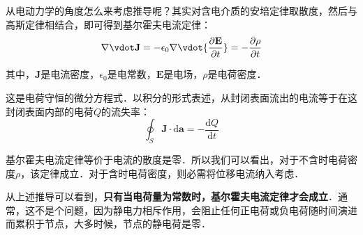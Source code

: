从电动力学的角度怎么来考虑推导呢？其实对含电介质的安培定律取散度，然后与高斯定律相结合，即可得到基尔霍夫电流定律：
\begin{equation}
\nabla \vdot \mathbf {J} =-\epsilon _{0}\nabla \vdot {\frac {\partial \mathbf {E} }{\partial t}}=-{\frac {\partial \rho }{\partial t}}
\end{equation}
 
其中，$\mathbf{J}$是电流密度，$\epsilon_0$是电常数，$\mathbf{E}$是电场，$\rho$是电荷密度．

这是电荷守恒的微分方程式．以积分的形式表述，从封闭表面流出的电流等于在这封闭表面内部的电荷$Q$的流失率：
\begin{equation}
\oint _{S}\mathbf {J} \cdot \mathrm {d} \mathbf {a} =-{\frac {\mathrm {d} Q}{\mathrm {d} t}}
\end{equation}

基尔霍夫电流定律等价于电流的散度是零．所以我们可以看出，对于不含时电荷密度$\rho$，该定律成立．对于含时电荷密度，则必需将位移电流纳入考虑．

从上述推导可以看到，\textbf{只有当电荷量为常数时，基尔霍夫电流定律才会成立}．通常，这不是个问题，因为静电力相斥作用，会阻止任何正电荷或负电荷随时间演进而累积于节点，大多时候，节点的静电荷是零．